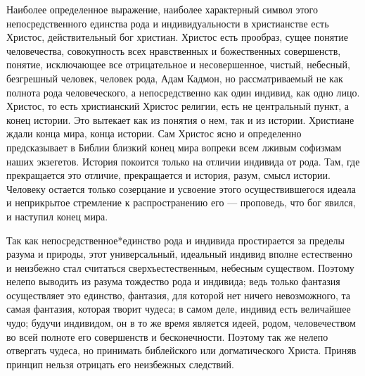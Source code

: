 \documentclass[12pt,oneside]{book}
\begin{document}
Наиболее определенное выражение, наиболее характерный символ этого непосредственного единства рода и индивидуальности в христианстве есть Христос, действительный бог христиан. Христос есть прообраз, сущее понятие человечества, совокупность всех нравственных и божественных совершенств, понятие, исключающее все отрицательное и несовершенное, чистый, небесный, безгрешный человек, человек рода, Адам Кадмон, но рассматриваемый не как полнота рода человеческого, а непосредственно как один индивид, как одно лицо. Христос, то есть христианский Христос религии, есть не центральный пункт, а конец истории. Это вытекает как из понятия о нем, так и из истории. Христиане ждали конца мира, конца истории. Сам Христос ясно и определенно предсказывает в Библии близкий конец мира вопреки всем лживым софизмам наших экзегетов. История покоится только на отличии индивида от рода. Там, где прекращается это отличие, прекращается и история, разум, смысл истории. Человеку остается только созерцание и усвоение этого осуществившегося идеала и неприкрытое стремление к распространению его --- проповедь, что бог явился, и наступил конец мира.

Так как непосредственное*\let\svthefootnote\thefootnote\let\thefootnote\relax{}\let\thefootnote\svthefootnote единство рода и индивида простирается за пределы разума и природы, этот универсальный, идеальный индивид вполне естественно и неизбежно стал считаться сверхъестественным, небесным существом. Поэтому нелепо выводить из разума тождество рода и индивида; ведь только фантазия осуществляет это единство, фантазия, для которой нет ничего невозможного, та самая фантазия, которая творит чудеса; в самом деле, индивид есть величайшее чудо; будучи индивидом, он в то же время является идеей, родом, человечеством во всей полноте его совершенств и бесконечности. Поэтому так же нелепо отвергать чудеса, но принимать библейского или догматического Христа. Приняв принцип нельзя отрицать его неизбежных следствий.
\end{document}
